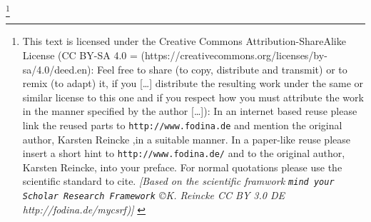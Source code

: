 %
%
%
%

\footnote{This text is licensed under the Creative Commons
Attribution-ShareAlike License (CC BY-SA 4.0 =
(https://creativecommons.org/licenses/by-sa/4.0/deed.en): Feel free \glqq{}to
share (to copy, distribute and transmit)\grqq{} or \glqq{}to remix (to
adapt)\grqq{} it, if you \glqq{}[\ldots] distribute the resulting work under the
same or similar license to this one\grqq{} and if you respect how \glqq{}you
must attribute the work in the manner specified by the author [\ldots]\grqq{}):
\newline
In an internet based reuse please link the reused parts to
\texttt{http://www.fodina.de} and mention the original author, Karsten Reincke
,in a suitable manner. In a paper-like reuse please insert a short hint to
\texttt{http://www.fodina.de/} and to the original author, Karsten Reincke, into
your preface. For normal quotations please use the scientific standard to cite.
\newline
{ \tiny \itshape [Based on the scientific framwork \texttt{mind your Scholar
Research Framework} \copyright K. Reincke CC BY 3.0 DE http://fodina.de/mycsrf)]
}}
